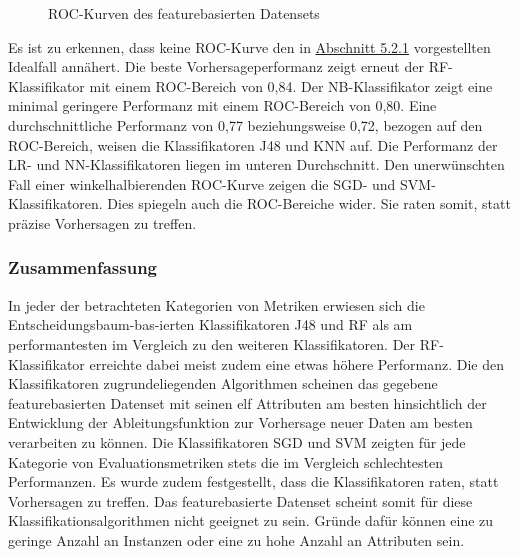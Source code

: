\begin{figure}[ht]
  \caption{ROC-Kurven des featurebasierten Datensets \label{fig:roc-feat}}
\end{figure}

Es ist zu erkennen, dass keine ROC-Kurve den in \hyperref[roc-def]{Abschnitt 5.2.1} vorgestellten Idealfall annähert. Die beste Vorhersageperformanz zeigt erneut der RF-Klassifikator mit einem ROC-Bereich von 0,84. Der NB-Klassifikator zeigt eine minimal geringere Performanz mit einem ROC-Bereich von 0,80. Eine durchschnittliche Performanz von 0,77 beziehungsweise 0,72, bezogen auf den ROC-Bereich, weisen die Klassifikatoren J48 und KNN auf. Die Performanz der LR- und NN-Klassifikatoren liegen im unteren Durchschnitt. Den unerwünschten Fall einer winkelhalbierenden ROC-Kurve zeigen die SGD- und SVM-Klassifikatoren. Dies spiegeln auch die ROC-Bereiche wider. Sie \glqq raten\grqq{} somit, statt präzise Vorhersagen zu treffen.

\subsubsection*{Zusammenfassung}
In jeder der betrachteten Kategorien von Metriken erwiesen sich die Entscheidungsbaum-bas-ierten Klassifikatoren J48 und RF als am performantesten im Vergleich zu den weiteren Klassifikatoren. Der RF-Klassifikator erreichte dabei meist zudem eine etwas höhere Performanz. Die den Klassifikatoren zugrundeliegenden Algorithmen scheinen das gegebene featurebasierten Datenset mit seinen elf Attributen am besten hinsichtlich der Entwicklung der Ableitungsfunktion zur Vorhersage neuer Daten am besten verarbeiten zu können.
Die Klassifikatoren SGD und SVM zeigten für jede Kategorie von Evaluationsmetriken stets die im Vergleich schlechtesten Performanzen. Es wurde zudem festgestellt, dass die Klassifikatoren raten, statt Vorhersagen zu treffen. Das featurebasierte Datenset scheint somit für diese Klassifikationsalgorithmen nicht geeignet zu sein. Gründe dafür können eine zu geringe Anzahl an Instanzen oder eine zu hohe Anzahl an Attributen sein.

